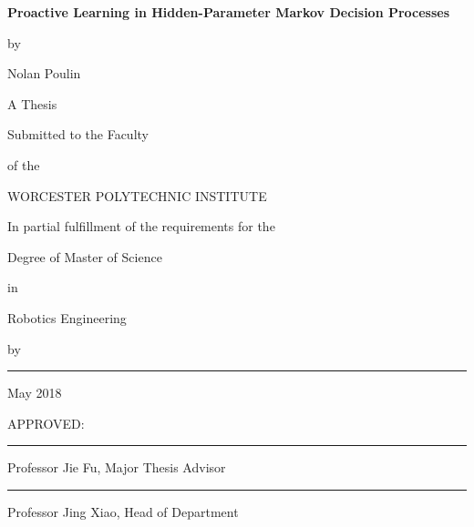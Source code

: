 \documentclass[12pt]{report}
\begin{document}
%




\thispagestyle{empty}

\begin{center}

\brk


   {\large
	\textbf{
	Proactive Learning in Hidden-Parameter Markov Decision Processes
	}
   }


\brk
by

\brk
Nolan Poulin


\brk\brk
A Thesis

\brk
Submitted to the Faculty

\brk
of the

\brk
WORCESTER POLYTECHNIC INSTITUTE

\brk
In partial fulfillment of the requirements for the

\brk
Degree of Master of Science

\brk
in

\brk
Robotics Engineering

\brk
by

\brk\brk
\rule{3in}{1.2pt}

\brk
May 2018

\end{center}


\vfill
APPROVED:

\vspace{0.5in}
\rule{3in}{0.8pt}

Professor Jie Fu, Major Thesis Advisor

\vspace{0.5in}
\rule{3in}{0.8pt}

Professor Jing Xiao, Head of Department
\end{document}
